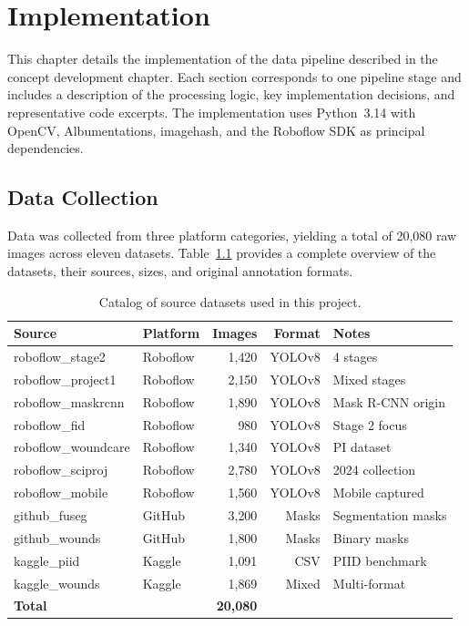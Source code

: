 \documentclass[a4paper,12pt,twoside]{report}
\begin{document}
\chapter{Implementation}
\label{ch:implementation}

This chapter details the implementation of the data pipeline described in the
concept development chapter. Each section corresponds to one pipeline stage and
includes a description of the processing logic, key implementation decisions,
and representative code excerpts. The implementation uses Python~3.14 with
OpenCV, Albumentations, imagehash, and the Roboflow SDK as principal
dependencies.

\section{Data Collection}
\label{sec:data-collection}

Data was collected from three platform categories, yielding a total of 20,080
raw images across eleven datasets. Table~\ref{tab:dataset-catalog} provides a
complete overview of the datasets, their sources, sizes, and original annotation
formats.

\begin{table}[htbp]
  \centering
  \caption{Catalog of source datasets used in this project.}
  \label{tab:dataset-catalog}
  \small
  \begin{tabularx}{\textwidth}{llrrX}
    \toprule
    \textbf{Source} & \textbf{Platform} & \textbf{Images} & \textbf{Format} &
      \textbf{Notes} \\
    \midrule
    roboflow\_stage2       & Roboflow & 1{,}420 & YOLOv8 & 4 stages \\
    roboflow\_project1     & Roboflow & 2{,}150 & YOLOv8 & Mixed stages \\
    roboflow\_maskrcnn     & Roboflow & 1{,}890 & YOLOv8 & Mask R-CNN origin \\
    roboflow\_fid          & Roboflow & 980     & YOLOv8 & Stage 2 focus \\
    roboflow\_woundcare    & Roboflow & 1{,}340 & YOLOv8 & PI dataset \\
    roboflow\_sciproj      & Roboflow & 2{,}780 & YOLOv8 & 2024 collection \\
    roboflow\_mobile       & Roboflow & 1{,}560 & YOLOv8 & Mobile captured \\
    github\_fuseg          & GitHub   & 3{,}200 & Masks  & Segmentation masks \\
    github\_wounds         & GitHub   & 1{,}800 & Masks  & Binary masks \\
    kaggle\_piid           & Kaggle   & 1{,}091 & CSV    & PIID benchmark \\
    kaggle\_wounds         & Kaggle   & 1{,}869 & Mixed  & Multi-format \\
    \midrule
    \textbf{Total}         &          & \textbf{20{,}080} & & \\
    \bottomrule
  \end{tabularx}
\end{table}
\end{document}
